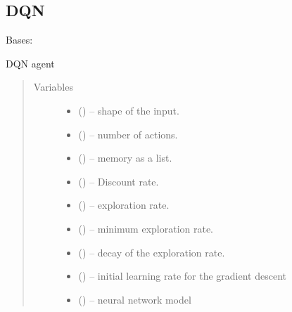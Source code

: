 \documentclass[letterpaper,10pt,english]{sphinxmanual}
\begin{document}
\subsection{DQN}
\label{\detokenize{package2:module-dqn}}\label{\detokenize{package2:dqn}}

\begin{fulllineitems}
\label{\detokenize{package2:dqn.DQNAgent}}
Bases: 

DQN agent
\begin{quote}\begin{description}
\item[{Variables}] \leavevmode\begin{itemize}
\item {} 
 (\sphinxstyleliteralemphasis{(}\sphinxstyleliteralemphasis{)}) -- shape of the input.

\item {} 
 () -- number of actions.

\item {} 
 (\sphinxstyleliteralemphasis{(}\sphinxstyleliteralemphasis{)}) -- memory as a list.

\item {} 
 () -- Discount rate.

\item {} 
 () -- exploration rate.

\item {} 
 () -- minimum exploration rate.

\item {} 
 () -- decay of the exploration rate.

\item {} 
 () -- initial learning rate for the gradient descent

\item {} 
 () -- neural network model


\end{itemize}
\end{description}
\end{quote}
\end{fulllineitems}
\end{document}
